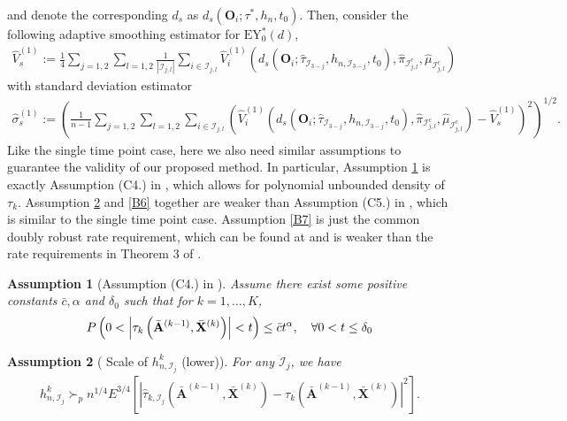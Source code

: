 \documentclass[11pt]{article}
\theoremstyle{referenceplain}
\newtheorem{assumption}{Assumption}
\theoremstyle{referencedefinition}
\theoremstyle{referenceremark}
\begin{document}
and denote the corresponding $d_{s}$ as $d_{s}(\mathbf{O}_i;\tau^*,h_n,t_0)$. 
Then, consider the following adaptive smoothing estimator for $\mathrm{EY}_0^*(d)$,
 \begin{align*}
     \widehat{V}_{s}^{(1)}:=\frac{1}{4}\sum_{j=1,2}\sum_{l=1,2}\frac{1}{|\mathcal{I}_{j,l}|}\sum_{i\in\mathcal{I}_{j,l}}\widehat{V}_i^{(1)}(d_{s}(\mathbf{O}_i;\widehat{\tau}_{\mathcal{I}_{3-j}},h_{n,\mathcal{I}_{3-j}},t_0),\widehat{\pi}_{\mathcal{I}_{j,l}^c},\widehat{\mu}_{\mathcal{I}_{j,l}^c})
 \end{align*}
 with standard deviation estimator
 \begin{align*}
     \widehat{\sigma}_{s}^{(1)}:=\left(\frac{1}{n-1}\sum_{j=1,2}\sum_{l=1,2}\sum_{i\in\mathcal{I}_{j,l}}\left(\widehat{V}_i^{(1)}(d_{s}(\mathbf{O}_i;\widehat{\tau}_{\mathcal{I}_{3-j}},h_{n,\mathcal{I}_{3-j}},t_0),\widehat{\pi}_{\mathcal{I}_{j,l}^c},\widehat{\mu}_{\mathcal{I}_{j,l}^c})-\widehat{V}_{s}^{(1)}\right)^2\right)^{1/2}.
 \end{align*}
Like the single time point case, here we also need similar assumptions to guarantee the validity of our proposed method. In particular, Assumption \ref{B4} is exactly Assumption (C4.) in \citet{shi2020breaking}, which allows for polynomial unbounded density of $\tau_k$. Assumption \ref{B5} and \ref{B6} together are weaker than Assumption (C5.) in \citet{shi2020breaking}, which is similar to the single time point case. Assumption \ref{B7} is just the common doubly robust rate requirement, which can be found at \citet{chernozhukov2018double} and is weaker than the rate requirements in Theorem 3 of \citet{shi2020breaking}.
\begin{assumption}[Assumption (C4.) in \citet{shi2020breaking}]\label{B4}
     Assume there exist some positive constants $\bar{c}, \alpha$ and $\delta_0$ such that for $k=1,\dots,K$,
$$
P\left(0<\left|\tau_k\left(\Bar{\mathbf{A}}^{(k-1)},\bar{\mathbf{X}}^{(k)}\right)\right|<t\right) \leq \bar{c} t^\alpha, \quad \forall 0<t \leq \delta_0
$$
\end{assumption}
\begin{assumption}[ Scale of $h_{n,\mathcal{I}_j}^{k}$ (lower)]\label{B5}
For any $\mathcal{I}_j$, we have
\begin{align*}
    h_{n,\mathcal{I}_j}^{k}\succ_p n^{1/4}E^{3/4}\left[|\widehat{\tau}_{k,\mathcal{I}_j}(\bar{\mathbf{A}}^{(k-1)},\bar{\mathbf{X}}^{(k)})-\tau_k(\bar{\mathbf{A}}^{(k-1)},\bar{\mathbf{X}}^{(k)})|^2\right].
\end{align*}
\end{assumption}
\end{document}
